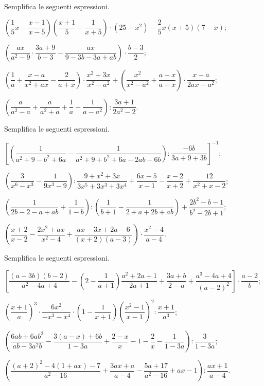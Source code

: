 \begin{esercizio}[\Ast]
Semplifica le seguenti espressioni.
\begin{enumeratea}
 \item $\left(\dfrac{1}{5}x-\dfrac{x-1}{x-5}\right)\left(\dfrac{x+1}{5}-\dfrac{1}{x+5}\right)\cdot (25-x^{2})-\dfrac{2}{5}x(x+5)(7-x)$;
 \item $\left(\dfrac{ax}{a^{2}-9}\cdot {\dfrac{3a+9}{b-3}}-\dfrac{ax}{9-3b-3a+ab}\right)\cdot {\dfrac{b-3}{2}}$;
 \item $\left(\dfrac{1}{a}+\dfrac{x-a}{x^{2}+ax}-\dfrac{2}{a+x}\right)\cdot {\dfrac{x^{2}+3x}{x^{2}-a^{2}}}+\left(\dfrac{x^{2}}{x^{2}-a^{2}}+\dfrac{a-x}{a+x}\right)\cdot {\dfrac{x-a}{2ax-a^{2}}}$;
 \item $\left(\dfrac{a}{a^{2}-a}+\dfrac{a}{a^{2}+a}+\dfrac{1}{a}-\dfrac{1}{a-a^{2}}\right):\dfrac{3a+1}{2a^{2}-2}$.
\end{enumeratea}
\end{esercizio}

\begin{esercizio}[\Ast]
Semplifica le seguenti espressioni.
\begin{enumeratea}
 \item $\left[\left(\dfrac{1}{a^{2}+9-b^{2}+6a}-\dfrac{1}{a^{2}+9+b^{2}+6a-2ab-6b}\right):\dfrac{-6b}{3a+9+3b}\right]^{-1}$;
 \item $\left(\dfrac{3}{x^{6}-x^{3}}-\dfrac{1}{9x^{3}-9}\right):\dfrac{9+x^{2}+3x}{3x^{5}+3x^{3}+3x^{4}}+\dfrac{6x-5}{x-1}-\dfrac{x-2}{x+2}+\dfrac{12}{x^{2}+x-2}$;
 \item $\left(\dfrac{1}{2b-2-a+ab}+\dfrac{1}{1-b}\right):\left(\dfrac{1}{b+1}-\dfrac{1}{2+a+2b+ab}\right)+\dfrac{2b^{2}-b-1}{b^{2}-2b+1}$;
 \item $\left(\dfrac{x+2}{x-2}-\dfrac{2x^{2}+ax}{x^{2}-4}+\dfrac{ax-3x+2a-6}{(x+2)(a-3)}\right)\cdot {\dfrac{x^{2}-4}{a-4}}$.
\end{enumeratea}
\end{esercizio}

\begin{esercizio}[\Ast]
Semplifica le seguenti espressioni.
\begin{enumeratea}
 \item $\left[\dfrac{(a-3b)(b-2)}{a^{2}-4a+4}-\left(2-\dfrac{1}{a+1}\right)\dfrac{a^{2}+2a+1}{2a+1}+\dfrac{3a+b}{2-a}+\dfrac{a^{3}-4a+4}{(a-2)^{2}}\right]\cdot {\dfrac{a-2}{b}}$;
 \item $\left(\dfrac{x+1}{a}\right)^{3}\cdot\dfrac{6x^{2}}{-x^{3}-x^{4}}\cdot \left(1-\dfrac{1}{x+1}\right)\left(\dfrac{x^{2}-1}{x-1}\right)^{2}:\dfrac{x+1}{a^{3}}$;
 \item $\left(\dfrac{6ab+6ab^{2}}{ab-3a^{2}b}-\dfrac{3(a-x)+6b}{1-3a}+\dfrac{2-x}{x}-1-\dfrac{2}{x}-\dfrac{1}{1-3a}\right):\dfrac{3}{1-3a}$;
 \item $\left(\dfrac{(a+2)^{2}-4(1+ax)-7}{a^{2}-16}+\dfrac{3ax+a}{a-4}-\dfrac{5a+17}{a^{2}-16}+ax-1\right):\dfrac{ax+1}{a-4}$.
\end{enumeratea}
\end{esercizio}

